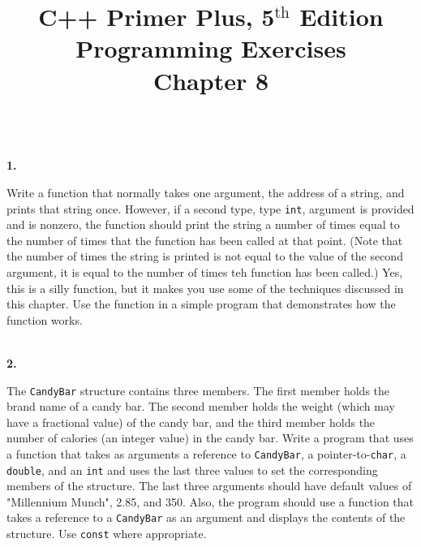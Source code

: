 \documentclass[10 pt]{amsart}
\newlength{\cwidth}
\newenvironment{cpart}[2][\cwidth]
	{\\ \phantom{\qquad}\textbf{#2. }\begin{minipage}[t]{#1}}
	{\end{minipage}}
\newcommand{\ttt}[1]{\texttt{#1}}
\newcommand{\ChapNum}{8}
\begin{document}
	\title
	[Chapter \ChapNum]
	{C++ Primer Plus, 5$^\text{th}$ Edition \\
	Programming Exercises \\
	Chapter \ChapNum}

	\maketitle

	\begin{cpart}{1}
		Write a function that normally takes one argument, the 
		address of a string, and prints that string once.
		However, if a second type, type \ttt{int}, argument is 
		provided and is nonzero, the function should print the
		string a number of times equal to the number of times that the
		function has been called at that point.
		(Note that the number of times the string is printed is not
		equal to the value of the second argument, it is equal
		to the number of times teh function has been called.)
		Yes, this is a silly function, but it makes you use some of the
		techniques discussed in this chapter.
		Use the function in a simple program that demonstrates how the
		function works.
	\end{cpart}
	\vspace{2ex}

	\begin{cpart}{2}
		The \ttt{CandyBar} structure contains three members.
		The first member holds the brand name of a candy bar.
		The second member holds the weight (which may have a fractional
		value) of the candy bar, and the third member holds the number
		of calories (an integer value) in the candy bar.
		Write a program that uses a function that takes as arguments
		a reference to \ttt{CandyBar}, a pointer-to-\ttt{char}, a 
		\ttt{double}, and an \ttt{int} and uses the last three
		values to set the corresponding members of the structure.
		The last three arguments should have default values of 
		"Millennium Munch", 2.85, and 350.
		Also, the program should use a function that takes a reference
		to a \ttt{CandyBar} as an argument and displays
		the contents of the structure.
		Use \ttt{const} where appropriate.
	\end{cpart}
	\vspace{2ex}
\end{document}
